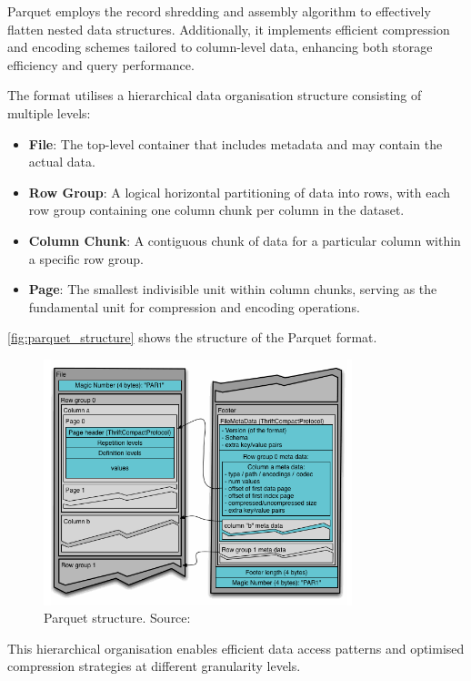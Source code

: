 Parquet employs the record shredding and assembly algorithm \citep{dremel_2010} to effectively flatten nested data structures.
Additionally, it implements efficient compression and encoding schemes tailored to column-level data, enhancing both storage efficiency and query performance.

The format utilises a hierarchical data organisation structure consisting of multiple levels:
\begin{itemize}
  \item \textbf{File}: The top-level container that includes metadata and may contain the actual data.
  \item \textbf{Row Group}: A logical horizontal partitioning of data into rows, with each row group containing one column chunk per column in the dataset.
  \item \textbf{Column Chunk}: A contiguous chunk of data for a particular column within a specific row group.
  \item \textbf{Page}: The smallest indivisible unit within column chunks, serving as the fundamental unit for compression and encoding operations.
\end{itemize}

\autoref{fig:parquet_structure} shows the structure of the Parquet format.

\begin{figure}[htbp]
  \centering
  \includegraphics[width=0.8\textwidth]{figs/related_work_theoretical_bg/parquet_structure.png}
  \caption[Parquet Structure]{Parquet structure. Source: \citet{parquet}}
  \label{fig:parquet_structure}
\end{figure}

This hierarchical organisation enables efficient data access patterns and optimised compression strategies at different granularity levels.

